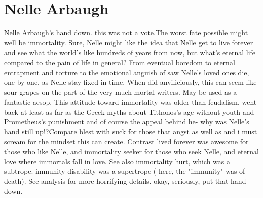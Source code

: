 \documentclass[12pt]{book}
\begin{document}
\chapter{Nelle Arbaugh}

Nelle Arbaugh's hand down. this was not a vote.The worst fate possible might well be immortality. Sure, Nelle might like the idea that Nelle get to live forever and see what the world's like hundreds of years from now, but what's eternal life compared to the pain of life in general? From eventual boredom to eternal entrapment and torture to the emotional anguish of saw Nelle's loved ones die, one by one, as Nelle stay fixed in time. When did anviliciously, this can seem like sour grapes on the part of the very much mortal writers. May be used as a fantastic aesop. This attitude toward immortality was older than feudalism, went back at least as far as the Greek myths about Tithonos's age without youth and Prometheus's punishment and of course the appeal behind he- why was Nelle's hand still up!?Compare blest with suck for those that angst as well as and i must scream for the mindset this can create. Contrast lived forever was awesome for those who like Nelle, and immortality seeker for those who seek Nelle, and eternal love where immortals fall in love. See also immortality hurt, which was a subtrope. immunity disability was a supertrope ( here, the "immunity" was of death). See analysis for more horrifying details. okay, seriously, put that hand down.
\end{document}
